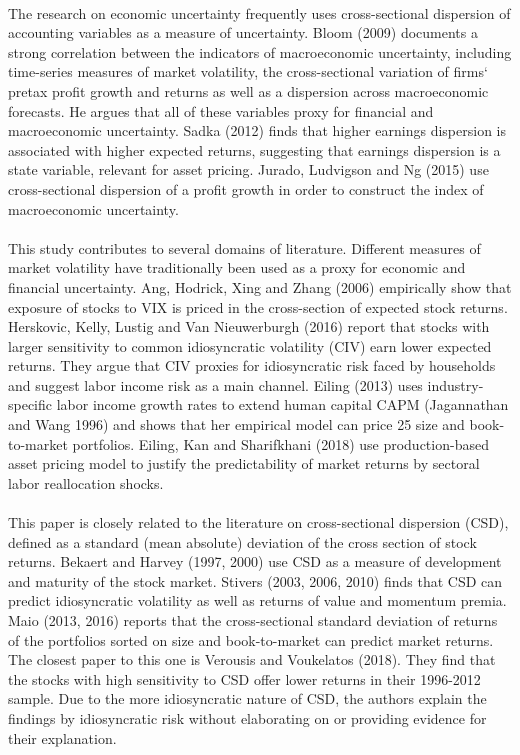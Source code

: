 \documentclass[12pt]{article}
\begin{document}
\paragraph{}
The research on economic uncertainty frequently uses cross-sectional dispersion of accounting variables as a measure of uncertainty. Bloom (2009) documents a strong correlation between the indicators of macroeconomic uncertainty, including time-series measures of market volatility, the cross-sectional variation of firms` pretax profit growth and returns as well as a dispersion across macroeconomic forecasts. He argues that all of these variables proxy for financial and macroeconomic uncertainty. Sadka (2012) finds that higher earnings dispersion is associated with higher expected returns, suggesting that earnings dispersion is a state variable, relevant for asset pricing. Jurado, Ludvigson and Ng (2015) use cross-sectional dispersion of a profit growth in order to construct the index of macroeconomic uncertainty.
\paragraph{}
This study contributes to several domains of literature. Different measures of market volatility have traditionally been used as a proxy for economic and financial uncertainty. Ang, Hodrick, Xing and Zhang (2006) empirically show that exposure of stocks to VIX is priced in the cross-section of expected stock returns. Herskovic, Kelly, Lustig and Van Nieuwerburgh (2016) report that stocks with larger sensitivity to common idiosyncratic volatility (CIV) earn lower expected returns. They argue that CIV proxies for idiosyncratic risk faced by households and suggest labor income risk as a main channel. Eiling (2013) uses industry-specific labor income growth rates to extend human capital CAPM (Jagannathan and Wang 1996) and shows that her empirical model can price 25 size and book-to-market portfolios. Eiling, Kan and Sharifkhani (2018) use production-based asset pricing model to justify the predictability of market returns by sectoral labor reallocation shocks. 
\paragraph{}
This paper is closely related to the literature on cross-sectional dispersion (CSD), defined as a standard (mean absolute) deviation of the cross section of stock returns. Bekaert and Harvey (1997, 2000) use CSD as a measure of development and maturity of the stock market. Stivers (2003, 2006, 2010) finds that CSD can predict idiosyncratic volatility as well as returns of value and momentum premia. Maio (2013, 2016) reports that the cross-sectional standard deviation of returns of the portfolios sorted on size and book-to-market can predict market returns. The closest paper to this one is Verousis and Voukelatos (2018). They find that the stocks with high sensitivity to CSD offer lower returns in their 1996-2012 sample. Due to the more idiosyncratic nature of CSD, the authors explain the findings by idiosyncratic risk without elaborating on or providing evidence for their explanation.
\end{document}
